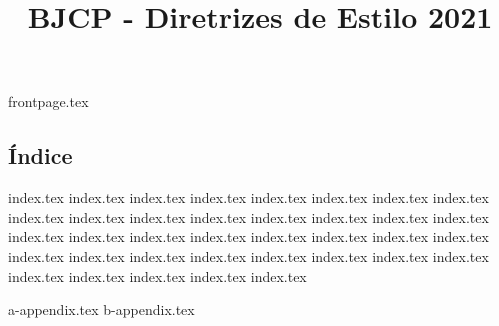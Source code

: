 \documentclass[a4paper, 9t]{article}
\title{BJCP - Diretrizes de Estilo 2021}
\renewcommand*\contentsname{}
\begin{document}
\raggedcolumns


{frontpage.tex}
\begin{multicols*}{2}
\section*{Índice}
\renewcommand\contentsname{}
\tableofcontents
\end{multicols*}

{index.tex}
{index.tex}
{index.tex}
{index.tex}
{index.tex}
{index.tex}
{index.tex}
{index.tex}
{index.tex}
{index.tex}
{index.tex}
{index.tex}
{index.tex}
{index.tex}
{index.tex}
{index.tex}
{index.tex}
{index.tex}
{index.tex}
{index.tex}
{index.tex}
{index.tex}
{index.tex}
{index.tex}
{index.tex}
{index.tex}
{index.tex}
{index.tex}
{index.tex}
{index.tex}
{index.tex}
{index.tex}
{index.tex}
{index.tex}
{index.tex}
{index.tex}
{index.tex}

{a-appendix.tex}
{b-appendix.tex}
\end{document}
